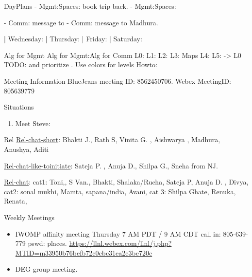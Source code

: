 \begin{columns}
\begin{column}{0.6\linewidth}
\begin{block}{DayPlans}
  - Mgmt:Spaces: book trip back. 
  - Mgmt:Spaces: 


  - Comm: message to 
  - Comm: message to Madhura.  

  | Wednesday: 
  | Thursday: 
| Friday: 
| Saturday:  
\end{block}

\begin{block}{Alg for Mgmt}
Alg for Mgmt:Alg for Comm   L0:  L1:  L2:  L3:  Maps L4: L5: -> L0
TODO:  and prioritize . Use colors for levels Howto:  
\end{block} 

\begin{block}{Meeting Information}
BlueJeans meeting ID: 8562450706.
Webex MeetingID: 805639779  
\end{block} 

\begin{block}{Situations} 
\begin{enumerate}
\item Meet Steve: 
\end{enumerate} 
\end{block}

\begin{block}{Rel}
\underline{Rel-chat-short}: Bhakti J., Rath S, Vinita G. , Aishwarya ,
Madhura, Anushya, Aditi 

\underline{Rel-chat-like-toinitiate}: Sateja P. , Anuja D., Shilpa G., Sneha from NJ. 

\underline{Rel-chat}:  cat1:  Toni,, S Van., Bhakti, Shalaka/Rucha, Sateja P, Anuja
D. ,  Divya, cat2: sonal mukhi, Mamta, sapana/india, Avani, cat 3:
Shilpa Ghate, Renuka, Renata, 
\end{block}
  
  \begin{block}{Weekly Meetings}
    \begin{itemize}
      \tiny \item \tiny IWOMP affinity meeting Thursday 7 AM PDT / 9 AM
      CDT call in: 805-639-779 pswd: places. \url{https://llnl.webex.com/llnl/j.php?MTID=m33950b76befb72c0cbc31ea2e3be720c}
    \item \tiny DEG group meeting.          \end{itemize}
  \end{block} 


\end{column}
\end{columns}
